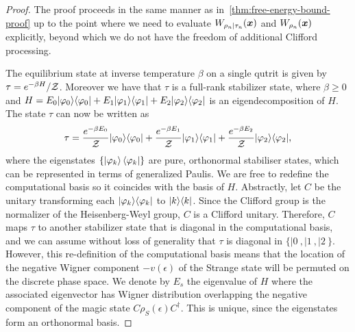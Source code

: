 \documentclass[pra,
aps,
twocolumn,
superscriptaddress,
groupedaddress,
nofootinbib,
reprint
]{revtex4-1}
\begin{document}
\begin{proof}
The proof proceeds in the same manner as in~\cref{thm:free-energy-bound-proof} up to the point where we need to evaluate $W_{\rho_n |\tau_n} (\boldsymbol{x})$ and $W_{\rho_n}(\boldsymbol{x})$ explicitly, beyond which we do not have the freedom of additional Clifford processing.

The equilibrium state at inverse temperature $\beta$ on a single qutrit is given by $\tau = e^{-\beta H} / \mathcal{Z}$. Moreover we have that $\tau$ is a full-rank stabilizer state, where $\beta \geq 0$ and $H = E_0 |\varphi_0\rangle\langle\varphi_0| + E_1 |\varphi_1\rangle\langle\varphi_1| + E_2 |\varphi_2\rangle\langle\varphi_2|$ is an eigendecomposition of $H$.
The state $\tau$ can now be written as 
\begin{equation}
	\tau = \frac{e^{-\beta E_0}}{\mathcal{Z}} |\varphi_0\rangle\langle\varphi_0| + \frac{e^{-\beta E_1}}{\mathcal{Z}} |\varphi_1\rangle\langle\varphi_1| + \frac{e^{-\beta E_2}}{\mathcal{Z}} |\varphi_2\rangle\langle\varphi_2|,
\end{equation}
where the eigenstates $\{\ket{\varphi_k}\langle\varphi_k|\}$ are pure, orthonormal stabiliser states, which can be represented in terms of generalized Paulis. We are free to redefine the computational basis so it coincides with the basis of $H$. Abstractly, let $C$ be the unitary transforming each $|\varphi_k\rangle\langle\varphi_k|$ to $|k\rangle\langle k|$. Since the Clifford group is the normalizer of the Heisenberg-Weyl group, $C$ is a Clifford unitary. Therefore, $C$ maps $\tau$ to another stabilizer state that is diagonal in the computational basis, and we can assume without loss of generality that $\tau$ is diagonal in $\{|0\>,|1\>, |2\>\}$. However, this re-definition of the computational basis means that the location of the negative Wigner component $-v(\epsilon)$ of the Strange state will be permuted on the discrete phase space. We denote by $E_s$ the eigenvalue of $H$ where the associated eigenvector has Wigner distribution overlapping the negative component of the magic state $C\rho_S(\epsilon)C^\dagger$.  This is unique, since the eigenstates form an orthonormal basis.


\end{proof}
\end{document}
